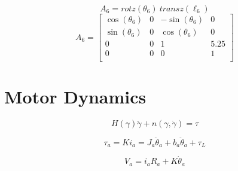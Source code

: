 \documentclass[12pt]{report}
\begin{document}
\vspace{.25ex}
\[
A_6 = rotz(\theta_6) ~ transz(\ell_6)
\]
\vspace{.5ex}
\[
A_6 =
\begin{bmatrix}
  \cos(\theta_6) & 0 & -\sin(\theta_6) & 0 \\
  \sin(\theta_6) & 0 & \cos(\theta_6) & 0 \\
  0 & 0 & 1 & 5.25 \\
  0 & 0 & 0 & 1 \\
\end{bmatrix}
\]

\newpage

\section{Motor Dynamics}
\begin{equation}
  H(\gamma)\ddot{\gamma} + n(\gamma,\dot{\gamma}) = \tau
  \label{eq:rdyn}
\end{equation}

\begin{equation}
  \tau_a = Ki_a = J_a\ddot{\theta}_a + b_a\ddot{\theta}_a + \tau_L
  \label{eq:pd}
\end{equation}


\begin{equation}
  V_a = i_aR_a + K\dot{\theta}_a
  \label{eq:va}
\end{equation}
\end{document}
